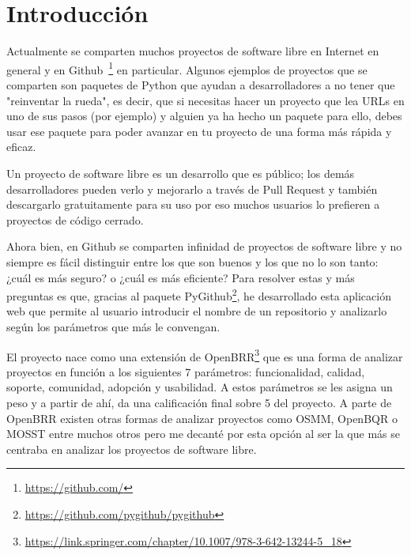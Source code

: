 \documentclass[a4paper, 12pt]{book}
\begin{document}
\tableofcontents 
\cleardoublepage
\listoffigures %



\cleardoublepage
\chapter{Introducción}
\label{chap:introducción}
\label{sec:intro} %

Actualmente se comparten muchos proyectos de software libre en Internet en general y en Github~\cite{website:GitHub}\footnote{\url{https://github.com/}} en particular. Algunos ejemplos de proyectos que se comparten son paquetes de Python que
ayudan a desarrolladores a no tener que "reinventar la rueda", es decir, que si necesitas hacer un proyecto que lea URLs en uno de sus pasos (por ejemplo) y alguien ya ha hecho un paquete para
ello, debes usar ese paquete para poder avanzar en tu proyecto de una forma más rápida y eficaz.

Un proyecto de software libre es un desarrollo que es público; los demás desarrolladores pueden verlo y mejorarlo a través de Pull Request y también descargarlo gratuitamente para su uso por eso muchos usuarios lo prefieren a proyectos de código cerrado.

Ahora bien, en Github se comparten infinidad de proyectos de software libre y no siempre es fácil distinguir entre los que son buenos y los que no lo son tanto: ¿cuál es más seguro? o ¿cuál es más eficiente?
Para resolver estas y más preguntas es que, gracias al paquete PyGithub\footnote{\url{https://github.com/pygithub/pygithub}}, he desarrollado esta aplicación web que permite al usuario introducir el nombre de un repositorio y analizarlo según los parámetros que más
le convengan.

El proyecto\cite{website:RepositorioTFG}  nace como una extensión de OpenBRR\footnote{\url{https://link.springer.com/chapter/10.1007/978-3-642-13244-5_18}} que es una forma de analizar proyectos en función a los siguientes 7 parámetros: funcionalidad, calidad, soporte, comunidad, adopción y usabilidad.
A estos parámetros se les asigna un peso y a partir de ahí, da una calificación final sobre 5 del proyecto. A parte de OpenBRR existen otras formas de analizar proyectos como OSMM, OpenBQR o MOSST entre muchos otros pero me decanté por esta opción al ser la que más se 
centraba en analizar los proyectos de software libre.
\end{document}
